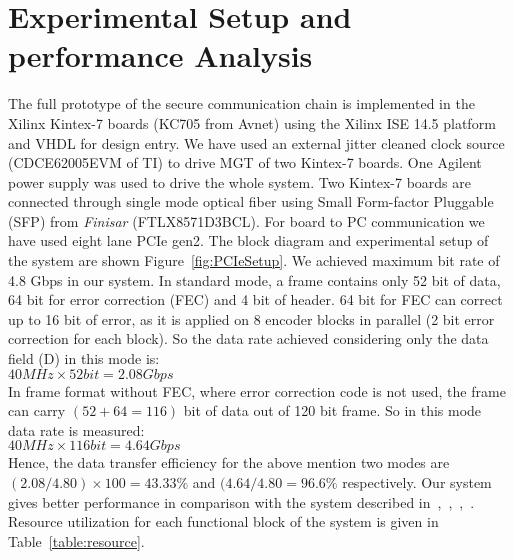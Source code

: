 \documentclass[a4paper]{jpconf}
\begin{document}
\iffalse.Figure~\ref{fig:FrameAlignerWork} shows how this block works.\fi   
\vspace{- 1 pc}
\section{Experimental Setup and performance Analysis} \label{PerformenceEvoluation}
The full prototype of the secure communication chain is implemented in the Xilinx Kintex-7 boards (KC705 from Avnet) using the Xilinx ISE 14.5 platform and VHDL for design entry. We have used an external jitter cleaned clock source (CDCE62005EVM of TI) to drive MGT of two Kintex-7 boards. One Agilent power supply was used to drive the whole system. Two Kintex-7 boards are connected through single mode optical fiber using Small Form-factor Pluggable (SFP) from \textit{Finisar} (FTLX8571D3BCL). For board to PC communication we have used eight lane PCIe gen2. 
The block diagram and experimental setup of the system are shown Figure~\ref{fig:PCIeSetup}. We achieved maximum bit rate of 4.8 Gbps in our system. In standard mode, a frame contains only 52 bit of data, 64 bit for error correction (FEC) and 4 bit of header. 64 bit for FEC can correct up to 16 bit of error, as it is applied on 8 encoder blocks in parallel (2 bit error correction for each block). So the data rate achieved considering only the data field (D) in this mode is: \\
$ 40 MHz \times 52 bit = 2.08 Gbps$ \\
In frame format without FEC, where error correction code is not used, the frame can carry $(52+64=116)$ bit of data out of 120 bit frame.
So in this mode data rate is measured: \\
$40 MHz \times 116 bit = 4.64 Gbps$ \\
Hence, the data transfer efficiency for the above mention two modes are $(2.08/4.80)\times 100 = 43.33\%$ and $(4.64/4.80 = 96.6\% $ respectively. Our system gives better performance in comparison with the system described in~\cite{kadric:socc:2012},~\cite{haoxu:nss:2007:XX},~\cite {mattihalli:cecnet:2012},~\cite{bohm:nss:mic:2012}.
Resource utilization for each functional block of the system is given in Table~\ref{table:resource}. 
\end{document}
